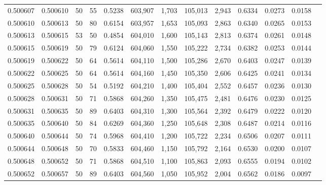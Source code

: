 \begin{tabular}{rrrrrrrrrrrrr}
0.500607 & 0.500610 &    50 &  55 &                                     0.5238 & 603,907 &   1,703 & 105,013 &   2,943 & 0.6334 & 0.0273 & 0.0158 \\
0.500610 & 0.500613 &    50 &  80 &                                     0.6154 & 603,957 &   1,653 & 105,093 &   2,863 & 0.6340 & 0.0265 & 0.0153 \\
0.500613 & 0.500615 &    53 &  50 &                                     0.4854 & 604,010 &   1,600 & 105,143 &   2,813 & 0.6374 & 0.0261 & 0.0148 \\
0.500615 & 0.500619 &    50 &  79 &                                     0.6124 & 604,060 &   1,550 & 105,222 &   2,734 & 0.6382 & 0.0253 & 0.0144 \\
0.500619 & 0.500622 &    50 &  64 &                                     0.5614 & 604,110 &   1,500 & 105,286 &   2,670 & 0.6403 & 0.0247 & 0.0139 \\
0.500622 & 0.500625 &    50 &  64 &                                     0.5614 & 604,160 &   1,450 & 105,350 &   2,606 & 0.6425 & 0.0241 & 0.0134 \\
0.500625 & 0.500628 &    50 &  54 &                                     0.5192 & 604,210 &   1,400 & 105,404 &   2,552 & 0.6457 & 0.0236 & 0.0130 \\
0.500628 & 0.500631 &    50 &  71 &                                     0.5868 & 604,260 &   1,350 & 105,475 &   2,481 & 0.6476 & 0.0230 & 0.0125 \\
0.500631 & 0.500635 &    50 &  89 &                                     0.6403 & 604,310 &   1,300 & 105,564 &   2,392 & 0.6479 & 0.0222 & 0.0120 \\
0.500635 & 0.500640 &    50 &  84 &                                     0.6269 & 604,360 &   1,250 & 105,648 &   2,308 & 0.6487 & 0.0214 & 0.0116 \\
0.500640 & 0.500644 &    50 &  74 &                                     0.5968 & 604,410 &   1,200 & 105,722 &   2,234 & 0.6506 & 0.0207 & 0.0111 \\
0.500644 & 0.500648 &    50 &  70 &                                     0.5833 & 604,460 &   1,150 & 105,792 &   2,164 & 0.6530 & 0.0200 & 0.0107 \\
0.500648 & 0.500652 &    50 &  71 &                                     0.5868 & 604,510 &   1,100 & 105,863 &   2,093 & 0.6555 & 0.0194 & 0.0102 \\
0.500652 & 0.500657 &    50 &  89 &                                     0.6403 & 604,560 &   1,050 & 105,952 &   2,004 & 0.6562 & 0.0186 & 0.0097 \\

\end{tabular}
